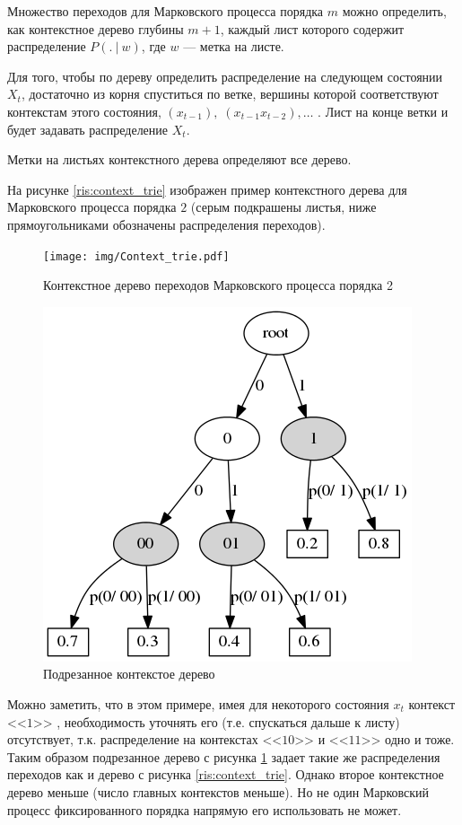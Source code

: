 \documentclass{matmex-diploma-custom}
\begin{document}
Множество переходов для Марковского процесса порядка $ m $ можно определить, как контекстное дерево глубины $ m+1 $, каждый лист которого содержит распределение $P(.~|~w)$, где $ w $ --- метка на листе.

Для того, чтобы по дереву определить распределение на следующем состоянии $ X_{t} $, достаточно из корня спуститься по ветке, вершины которой соответствуют контекстам этого состояния, $(x_{t-1}),\; (x_{t-1}x_{t-2}), \ldots$ . Лист на конце ветки и будет задавать распределение $ X_{t} $.


\begin{remark}
Метки на листьях контекстного дерева определяют все дерево.
\end{remark}

На рисунке \ref{ris:context_trie} изображен пример контекстного дерева для Марковского процесса порядка $ 2 $ (серым подкрашены листья, ниже прямоугольниками обозначены распределения переходов).
\begin{figure}[h!]\centering
\begin{minipage}[b]{0.49 \textwidth}
	\texttt{[image: img/Context\_trie.pdf]}
	\centering
	\caption{ Контекстное дерево переходов Марковского процесса порядка 2 }
	\label{ris:context_trie}
	
\end{minipage}
\hfil \hfil
\begin{minipage}[b]{0.49 \textwidth}
	\includegraphics[scale=0.4]{img/Prune_c_trie.png}
	\centering
	\caption{ Подрезанное контекстое дерево }
	\label{ris:prune_c_trie}
\end{minipage}
\end{figure}
Можно заметить, что в этом примере, имея для некоторого состояния $x_{t}$ контекст  <<$1$>> , необходимость уточнять его (т.е. спускаться дальше к листу) отсутствует, т.к. распределение на контекстах  <<$10$>>  и  <<$11$>>  одно и тоже. 
Таким образом подрезанное дерево с рисунка \ref{ris:prune_c_trie} задает такие же распределения переходов как и дерево с рисунка \ref{ris:context_trie}. 
Однако второе контекстное дерево меньше (число главных контекстов меньше).
Но не один Марковский процесс фиксированного порядка напрямую его использовать не может.
\end{document}
